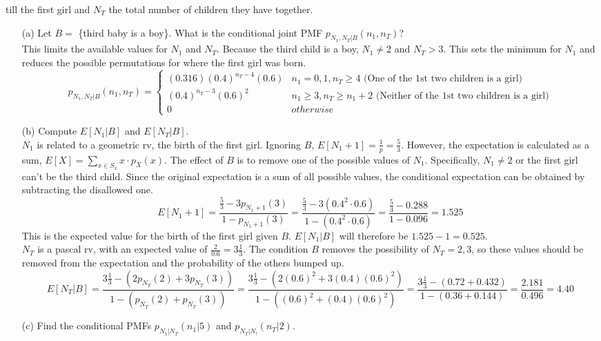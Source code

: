 \documentclass{report}
\begin{document}
\begin{enumerate}
till the first girl and $N_T$ the total number of children they have together.
\begin{itemize}
  \item[(a)] Let $B=$ \{third baby is a boy\}. What is the conditional joint PMF $p_{N_1, N_T|B}(n_1,n_T)$?\\
This limits the available values for $N_1$ and $N_T$. Because the third child is a boy, $N_1 \neq 2$ and $N_T > 3$. This sets the minimum for $N_1$ and reduces the possible permutations for where the first girl was born.\\
$$p_{N_1, N_T|B}(n_1,n_T) = \left. \begin{cases}
(0.316)(0.4)^{n_T - 4}(0.6) & n_1 = 0,1,  n_T \geq 4  \text{ (One of the 1st two children is a girl)} \\
(0.4)^{n_T - 3}(0.6)^2 & n_1 \geq 3,  n_T \geq n_1 + 2  \text{ (Neither of the 1st two children is a girl)} \\
0 & otherwise
\end{cases} \right.$$
\item[(b)] Compute $E[N_1|B]$ and $E[N_T|B]$.\\
$N_1$ is related to a geometric rv, the birth of the first girl. Ignoring $B$, $E[N_1 +1] = \frac{1}{p} = \frac{5}{3}$. However, the expectation is calculated as a sum, $E[X] = \sum_{x \in S_x} x \cdot p_X(x)$.
The effect of $B$ is to remove one of the possible values of $N_1$. Specifically, $N_1 \neq 2$ or the first girl can't be the third child. Since the original expectation is a sum of all possible values, the conditional expectation can be obtained by subtracting the disallowed one.
$$E[N_1 +1] =  \frac{\frac{5}{3} - 3p_{N_1+1}(3)}{1-p_{N_1+1}(3)} = \frac{\frac{5}{3} - 3(0.4^2 \cdot 0.6)}{1-(0.4^2 \cdot 0.6)} = \frac{\frac{5}{3} - 0.288}{1-0.096} = 1.525$$
This is the expected value for the birth of the first girl given $B$. $E[N_1|B]$ will therefore be $1.525 - 1 = 0.525$.\\
$N_T$ is a pascal rv, with an expected value of $\frac{2}{0.6} = 3\frac{1}{3}$. The condition $B$ removes the possibility of $N_T = 2,3$, so these values should be removed from the expectation and the probability of the others bumped up.
$$ E[N_T|B] = \frac{3\frac{1}{3} - (2p_{N_T}(2) + 3p_{N_T}(3))}{1 -(p_{N_T}(2) + p_{N_T}(3)) } = \frac{3\frac{1}{3} - (2(0.6)^2 + 3(0.4)(0.6)^2)}{1 -((0.6)^2 + (0.4)(0.6)^2) } =  \frac{3\frac{1}{3} - (0.72 + 0.432)}{1 -(0.36 + 0.144) } = \frac{2.181}{0.496} = 4.40 $$
\item[(c)] Find the conditional PMFs $p_{N_1|N_T}(n_1|5)$ and $p_{N_T|N_!}(n_T|2)$.\\

\end{itemize}
\end{enumerate}
\end{document}
